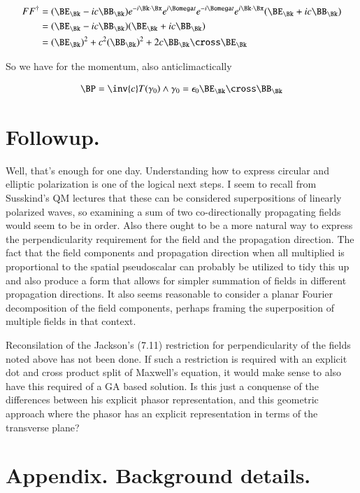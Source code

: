 \begin{align*}
F F^\dagger 
&= (\BE_\Bk - i c \BB_\Bk) e^{-i \Bk \cdot \Bx} e^{i\Bomega t}  e^{-i\Bomega t} e^{i \Bk \cdot \Bx} (\BE_\Bk + i c \BB_\Bk)  \\
&= (\BE_\Bk - i c \BB_\Bk) (\BE_\Bk + i c \BB_\Bk) \\
&= (\BE_\Bk)^2 + c^2 (\BB_\Bk)^2 + 2 c \BB_\Bk \cross \BE_\Bk
\end{align*}

So we have for the momentum, also anticlimactically

\begin{align}
\BP = \inv{c} T(\gamma_0) \wedge \gamma_0 = \epsilon_0 \BE_\Bk \cross \BB_\Bk 
\end{align}

\section{Followup.}

Well, that's enough for one day.  Understanding how to express circular and elliptic polarization is one of the logical next steps.  I seem to recall from Susskind's QM lectures that these can be considered superpositions of linearly polarized waves, so examining a sum of two co-directionally propagating fields would seem to be in order.  Also there ought to be a more natural way to express the perpendicularity requirement for the field and the propagation direction.  The fact that the field components and propagation direction when all multiplied is proportional to the spatial pseudoscalar can probably be utilized to tidy this up and also produce a form that allows for simpler summation of fields in different propagation directions.  It also seems reasonable to consider a planar Fourier decomposition of the field components, perhaps framing the superposition of multiple fields in that context.

Reconsilation of the Jackson's (7.11) restriction for perpendicularity of the fields noted above has not been done.  If such a restriction is required with an explicit dot and cross product split of Maxwell's equation, it would make sense to also have this required of a GA based solution.  Is this just a conquense of the differences between his explicit phasor representation, and this geometric approach where the phasor has an explicit representation in terms of the transverse plane?

\section{Appendix.  Background details.}

